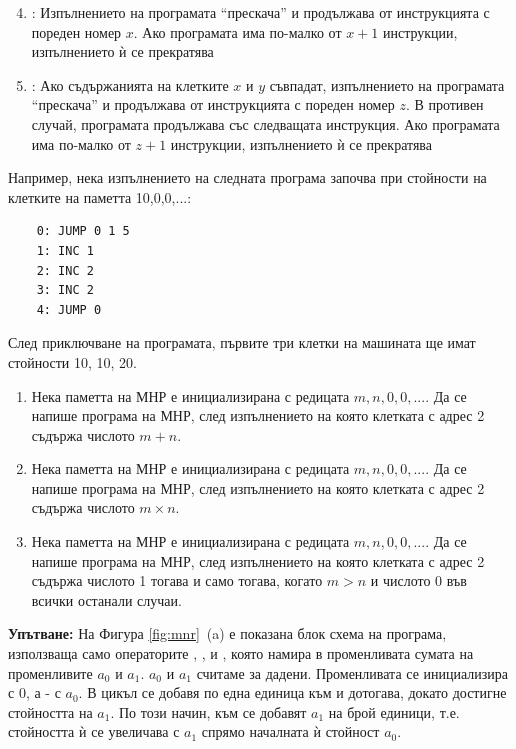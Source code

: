 {\begin{mdframed}[hidealllines=true,backgroundcolor=gray!20]
	\begin{enumerate}[label=\arabic*)]
	\setcounter{enumi}{3}
		\item {}: Изпълнението на програмата ``прескача'' и продължава от инструкцията с пореден номер $x$. Ако програмата има по-малко от $x+1$ инструкции, изпълнението ѝ се прекратява
		\item {}: Ако съдържанията на клетките  $x$ и $y$ съвпадат, изпълнението на програмата ``прескача'' и продължава от инструкцията с пореден номер $z$. В противен случай, програмата продължава със следващата инструкция. Ако програмата има по-малко от $z+1$ инструкции, изпълнението ѝ се прекратява
	\end{enumerate}

	Например, нека изпълнението на следната програма започва при стойности на клетките на паметта 10,0,0,...:

	\begin{verbatim}
	0: JUMP 0 1 5
	1: INC 1
	2: INC 2
	3: INC 2
	4: JUMP 0
	\end{verbatim}

	След приключване на програмата, първите три клетки на машината ще имат стойности 10, 10, 20.

\end{mdframed}

\begin{enumerate}[resume]
	\item Нека паметта на МНР е инициализирана с редицата $m,n,0,0,...$. Да се напише програма на МНР, след изпълнението на която клетката с адрес 2 съдържа числото $m+n$.
	\item Нека паметта на МНР е инициализирана с редицата $m,n,0,0,...$. Да се напише програма на МНР, след изпълнението на която клетката с адрес 2 съдържа числото $m \times n$.
	\item Нека паметта на МНР е инициализирана с редицата $m,n,0,0,...$. Да се напише програма на МНР, след изпълнението на която клетката с адрес 2 съдържа числото 1 тогава и само тогава, когато $m>n$ и числото 0 във всички останали случаи.
\end{enumerate}

\begin{mdframed}[hidealllines=true,backgroundcolor=gray!20]
\textbf{Упътване:} На Фигура \ref{fig:mnr}~(a) е показана блок схема на програма, използваща само операторите \code{=}, \code{==}, \code{++} и , която намира в променливата  сумата на променливите $a_0$ и $a_1$. $a_0$ и $a_1$ считаме за дадени. Променливата  се инициализира с 0, а  - с $a_0$. В цикъл се добавя по една единица към  и  дотогава, докато  достигне стойността на $a_1$. По този начин, към  се добавят $a_1$ на брой единици, т.е. стойността ѝ се увеличава с $a_1$ спрямо началната ѝ стойност $a_0$.


\end{mdframed}}
